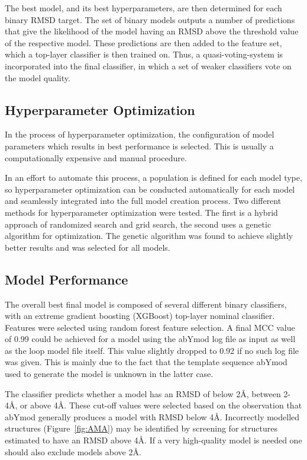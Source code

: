 \documentclass[12pt]{article}
\begin{document}
The best model, and its best hyperparameters, are then determined for
each binary RMSD target. The set of binary models outputs a number of
predictions that give the likelihood of the model having an RMSD above
the threshold value of the respective model. These predictions are
then added to the feature set, which a top-layer classifier is then
trained on. Thus, a quasi-voting-system is incorporated into the final
classifier, in which a set of weaker classifiers vote on the model
quality.

\subsection{Hyperparameter Optimization}
In the process of hyperparameter optimization, the configuration of
model parameters which results in best performance is selected. This
is usually a computationally expensive and manual procedure.

In an effort to automate this process, a population is defined for
each model type, so hyperparameter optimization can be conducted
automatically for each model and seamlessly integrated into the full
model creation process. Two different methods for hyperparameter
optimization were tested. The first is a hybrid approach of randomized
search and grid search, the second uses a genetic algorithm for
optimization. The genetic algorithm was found to achieve slightly
better results and was selected for all models.

\subsection{Model Performance}
The overall best final model is composed of several different binary
classifiers, with an extreme gradient boosting (XGBoost) top-layer
nominal classifier. Features were selected using random forest feature
selection. A final MCC value of 0.99 could be achieved for a model
using the abYmod log file as input as well as the loop model file
itself. This value slightly dropped to 0.92 if no such log file was
given. This is mainly due to the fact that the template sequence
abYmod used to generate the model is unknown in the latter case.

The classifier predicts whether a model has an RMSD of below 2\AA,
between 2-4\AA, or above 4\AA. These cut-off values were selected
based on the observation that abYmod generally produces a model with
RMSD below 4\AA. Incorrectly modelled structures (Figure~\ref{fig:AMA}) may
be identified by screening for structures estimated to have an RMSD
above 4\AA. If a very high-quality model is needed one should also
exclude models above 2\AA.
\end{document}
